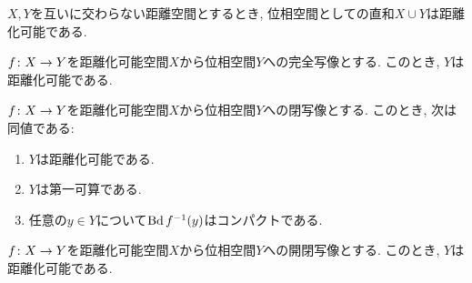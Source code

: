 \documentclass[uplatex, dvipdfmx, a4paper, 12pt, class=jsbook, crop=false]{standalone}
\begin{document}
\begin{proposition}
	$ X, Y $を互いに交わらない距離空間とするとき,
	位相空間としての直和$ X \cup Y $は距離化可能である.
\end{proposition}

\begin{proposition}
	$ f\colon X\to Y $を距離化可能空間$ X $から位相空間$ Y $への完全写像とする.
	このとき, $ Y $は距離化可能である.
\end{proposition}

\begin{theorem}
	$ f\colon X\to Y $を距離化可能空間$ X $から位相空間$ Y $への閉写像とする.
	このとき, 次は同値である:
	\begin{enumerate}
		\item $ Y $は距離化可能である.
		\item $ Y $は第一可算である.
		\item 任意の$ y \in Y $について$ \topbd \mapinvpt{f}{y} $はコンパクトである.
	\end{enumerate}
\end{theorem}

\begin{proposition}
	$ f\colon X\to Y $を距離化可能空間$ X $から位相空間$ Y $への開閉写像とする.
	このとき, $ Y $は距離化可能である.
\end{proposition}
\end{document}

